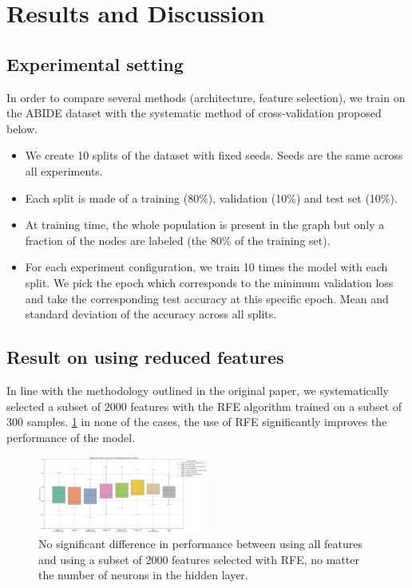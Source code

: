 \section{Results and Discussion}



\subsection{Experimental setting}
In order to compare several methods (architecture, feature selection), we train on the ABIDE dataset with the systematic method of cross-validation proposed below.
\begin{itemize}
	\item We create 10 splits of the dataset with fixed seeds. Seeds are the same across all experiments.
	\item Each split is made of a training (80\%), validation (10\%) and test set (10\%).
	\item At training time, the whole population is present in the graph but only a fraction of the nodes are labeled (the 80\% of the training set).
	\item For each experiment configuration, we train 10 times the model with each split.
	We pick the epoch which corresponds to the minimum validation loss and take the corresponding test accuracy at this specific epoch. Mean and standard deviation of the accuracy across all splits.
\end{itemize}


\subsection{Result on using reduced features}
In line with the methodology outlined in the original paper, we systematically selected a subset of $2000$ features with the RFE algorithm trained on a subset of 300 samples.
\ref{fig:results_feature_reduction}  in none of the cases, the use of RFE significantly improves the performance of the model.

\begin{figure}[h!]
    \centering
    \includegraphics[width=0.5\textwidth]{figures/performances_fully_connected_RFE.png}
    \caption{No significant difference in performance between using all features and using a subset of 2000 features selected with RFE, no matter the number of neurons in the hidden layer.}
    \Description{}
    \label{fig:results_feature_reduction}
\end{figure}

